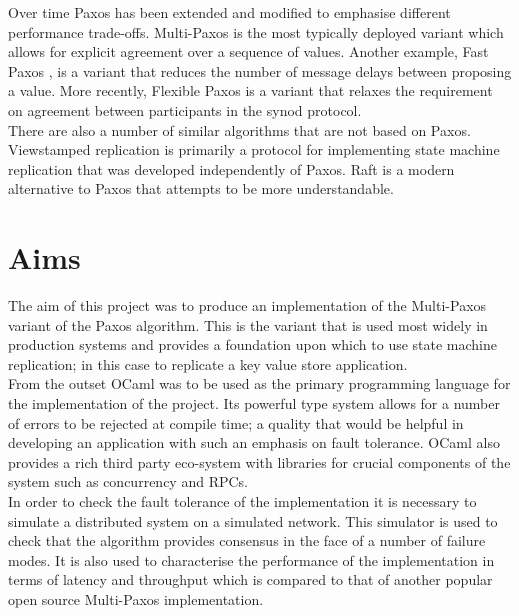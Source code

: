 Over time Paxos has been extended and modified to emphasise different performance trade-offs. Multi-Paxos is the most typically deployed variant which allows for explicit agreement over a sequence of values. Another example, Fast Paxos \cite{fast-paxos}, is a variant that reduces the number of message delays between proposing a value. More recently, Flexible Paxos \cite{DBLP:journals/corr/HowardMS16} is a variant that relaxes the requirement on agreement between participants in the synod protocol. \\

There are also a number of similar algorithms that are not based on Paxos. Viewstamped replication \cite{Oki:1988:VRN:62546.62549} is primarily a protocol for implementing state machine replication that was developed independently of Paxos. Raft \cite{Ongaro:2014:SUC:2643634.2643666} is a modern alternative to Paxos that attempts to be more understandable.

\section{Aims}

The aim of this project was to produce an implementation of the Multi-Paxos variant of the Paxos algorithm. This is the variant that is used most widely in production systems and provides a foundation upon which to use state machine replication; in this case to replicate a key value store application. \\

From the outset OCaml was to be used as the primary programming language for the implementation of the project. Its powerful type system allows for a number of errors to be rejected at compile time; a quality that would be helpful in developing an application with such an emphasis on fault tolerance. OCaml also provides a rich third party eco-system with libraries for crucial components of the system such as concurrency and RPCs. \\

In order to check the fault tolerance of the implementation it is necessary to simulate a distributed system on a simulated network. This simulator is used to check that the algorithm provides consensus in the face of a number of failure modes. It is also used to characterise the performance of the implementation in terms of latency and throughput which is compared to that of another popular open source Multi-Paxos implementation.




